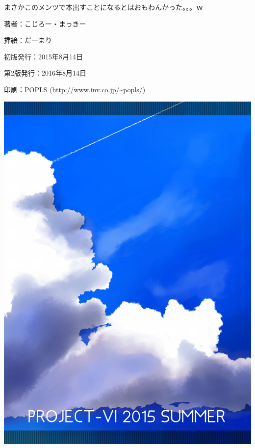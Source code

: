 ﻿\documentclass[9pt,b5paper,tombo,openany]{jsbook}
\begin{document}
まさかこのメンツで本出すことになるとはおもわんかった。。。ｗ

\newpage

\thispagestyle{empty}
\begin{flushright}
	\begin{minipage}{0.5\hsize}
		\begin{description}
			\item{著者：}こじろー・まっきー
			\item{挿絵：}だーまり
			\item{初版発行：}2015年8月14日
			\item{第2版発行：}2016年8月14日
			\item{印刷：}POPLS (\url{http://www.inv.co.jp/~popls/})
		\end{description}
	\end{minipage}
\end{flushright}

\mbox{}
\newpage
\thispagestyle{empty}
\mbox{}
\newpage
\thispagestyle{empty}

\newpage

\enlargethispage{\paperwidth}
\thispagestyle{empty}
\vspace*{-1truein}
\vspace*{-\topmargin}
\vspace*{-1.15\headheight}
\vspace*{-\headsep}
\vspace*{-\topskip}
\noindent\hspace*{-1.16in}\hspace*{-\oddsidemargin}
\includegraphics[width=1.042\paperwidth]{./img/ura-hyoushi.pdf}
\end{document}
